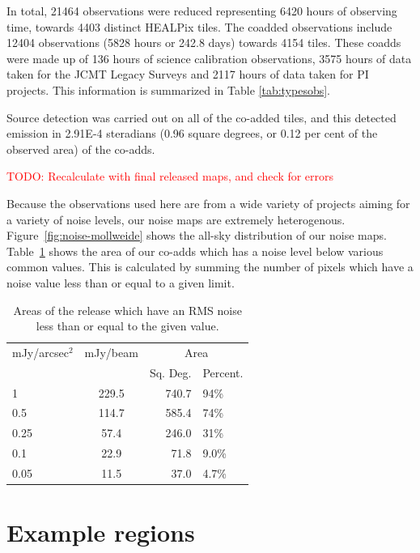 \documentclass[twocolumn]{aastex6}
\newcommand{\todo}[1]{\textcolor{red}{TODO: #1}}
\begin{document}
In total, 21464 observations were reduced representing 6420 hours of
observing time, towards 4403 distinct HEALPix tiles. The coadded
observations include 12404 observations (5828 hours or 242.8 days)
towards 4154 tiles. These coadds were made up of 136 hours of science
calibration observations, 3575 hours of data taken for the JCMT Legacy
Surveys and 2117 hours of data taken for PI projects. This information
is summarized in Table \ref{tab:typesobs}.


Source detection was carried out on all of the co-added tiles, and this
detected emission in 2.91E-4 steradians (0.96 square degrees, or 0.12
per cent of the observed area) of the co-adds.



\todo{Recalculate with final released maps, and check for errors}

Because the observations used here are from a wide variety of projects
aiming for a variety of noise levels, our noise maps are extremely
heterogenous. Figure~\ref{fig:noise-mollweide} shows the all-sky
distribution of our noise maps. Table~\ref{tab:noises} shows the area
of our co-adds which has a noise level below various common
values. This is calculated by summing the number of
pixels which have a noise value less than or equal to a given limit.


\begin{table}
\centering
\begin{tabular}{l c r l}
  \hline
  mJy/arcsec$^{2}$& mJy/beam  & \multicolumn{2}{c}{Area}\\
                &          &  Sq. Deg. & Percent. \\
  \hline
  1  & 229.5& 740.7 & 94\% \\
  0.5  & 114.7& 585.4 & 74\% \\
  0.25  & 57.4& 246.0 & 31\%\\
  0.1 & 22.9& 71.8 & 9.0\%\\
  0.05 & 11.5& 37.0 & 4.7\%\\
  \hline
\end{tabular}
\caption{Areas of the release which have an RMS noise less than or
  equal to the given value. \label{tab:noises} }
\end{table}

\section{Example regions}
\end{document}
